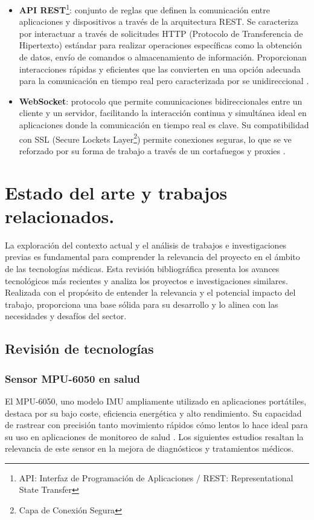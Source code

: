 \begin{itemize}
    \item \textbf{API REST}\footnote{API: Interfaz de Programación de Aplicaciones / REST: Representational State Transfer}: conjunto de reglas que definen la comunicación entre aplicaciones y dispositivos a través de la arquitectura REST. Se caracteriza por interactuar a través de solicitudes HTTP (Protocolo de Transferencia de Hipertexto) estándar para realizar operaciones específicas como la obtención de datos, envío de comandos o almacenamiento de información. Proporcionan interacciones rápidas y eficientes que las convierten en una opción adecuada para la comunicación en tiempo real pero caracterizada por se unidireccional \cite{IBMrest:online}.
    \item \textbf{WebSocket}: protocolo que permite comunicaciones bidireccionales entre un cliente y un servidor, facilitando la interacción continua y simultánea ideal en aplicaciones donde la comunicación en tiempo real es clave. Su compatibilidad con SSL (Secure Lockets Layer\footnote{Capa de Conexión Segura}) permite conexiones seguras, lo que se ve reforzado por su forma de trabajo a través de un cortafuegos y proxies \cite{WebSocke46:online}.
\end{itemize}

\section{Estado del arte y trabajos relacionados.}
La exploración del contexto actual y el análisis de trabajos e investigaciones previas es fundamental para comprender la relevancia del proyecto en el ámbito de las tecnologías médicas. Esta revisión bibliográfica presenta los avances tecnológicos más recientes y analiza los proyectos e investigaciones similares. Realizada con el propósito de entender la relevancia y el potencial impacto del trabajo, proporciona una base sólida para su desarrollo y lo alinea con las necesidades y desafíos del sector.

\subsection{Revisión de tecnologías}

\subsubsection{Sensor MPU-6050 en salud}
El MPU-6050, uno modelo IMU ampliamente utilizado en aplicaciones portátiles, destaca por su bajo coste, eficiencia energética y alto rendimiento. Su capacidad de rastrear con precisión tanto movimiento rápidos cómo lentos lo hace ideal para su uso en aplicaciones de monitoreo de salud \cite{Jian2016/06}. Los siguientes estudios resaltan la relevancia de este sensor en la mejora de diagnósticos y tratamientos médicos.

